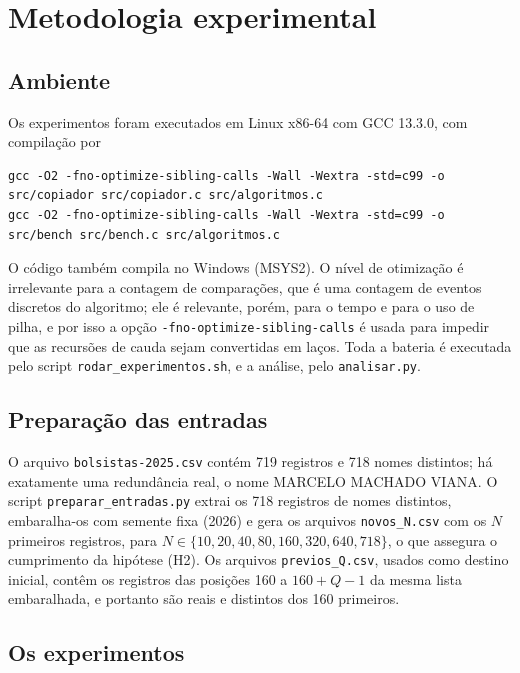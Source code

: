 \documentclass[11pt,a4paper]{article}
\begin{document}
\section{Metodologia experimental}

\subsection{Ambiente}
\label{sec:ambiente}

Os experimentos foram executados em Linux x86-64 com GCC 13.3.0, com compilação por
\begin{lstlisting}[style=cmd]
gcc -O2 -fno-optimize-sibling-calls -Wall -Wextra -std=c99 -o src/copiador src/copiador.c src/algoritmos.c
gcc -O2 -fno-optimize-sibling-calls -Wall -Wextra -std=c99 -o src/bench src/bench.c src/algoritmos.c
\end{lstlisting}
O código também compila no Windows (MSYS2). O nível de otimização é irrelevante para a contagem de comparações, que é uma contagem de eventos discretos do algoritmo; ele é relevante, porém, para o tempo e para o uso de pilha, e por isso a opção \texttt{-fno-optimize-sibling-calls} é usada para impedir que as recursões de cauda sejam convertidas em laços. Toda a bateria é executada pelo script \texttt{rodar\_experimentos.sh}, e a análise, pelo \texttt{analisar.py}.

\subsection{Preparação das entradas}
\label{sec:entradas}

O arquivo \texttt{bolsistas-2025.csv} contém 719 registros e 718 nomes distintos; há exatamente uma redundância real, o nome MARCELO MACHADO VIANA. O script \texttt{preparar\_entradas.py} extrai os 718 registros de nomes distintos, embaralha-os com semente fixa (2026) e gera os arquivos \texttt{novos\_N.csv} com os $N$ primeiros registros, para $N\in\{10,20,40,80,160,320,640,718\}$, o que assegura o cumprimento da hipótese (H2). Os arquivos \texttt{previos\_Q.csv}, usados como destino inicial, contêm os registros das posições 160 a $160+Q-1$ da mesma lista embaralhada, e portanto são reais e distintos dos 160 primeiros.

\subsection{Os experimentos}
\end{document}
